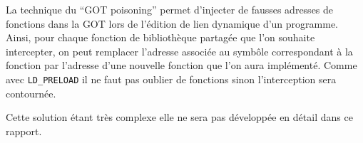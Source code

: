 La technique du ``GOT poisoning'' \citep{GOT_poisoning} permet d'injecter de fausses adresses de fonctions dans la GOT lors de l'édition de lien dynamique d'un programme. Ainsi, pour chaque fonction de bibliothèque partagée que l'on souhaite intercepter, on peut remplacer l'adresse associée au symbôle correspondant à la fonction par l'adresse d'une nouvelle fonction que l'on aura implémenté. Comme avec \texttt{LD\_PRELOAD} il ne faut pas oublier de fonctions sinon l'interception sera contournée.

Cette solution étant très complexe elle ne sera pas développée en détail dans ce rapport.

\vspace{0.5cm}
